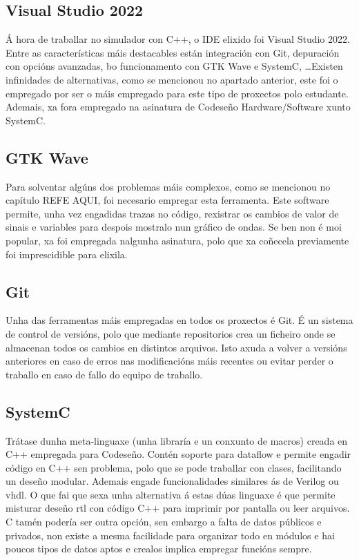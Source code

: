 \subsection{Visual Studio 2022}\label{sec:visual_studio}
Á hora de traballar no simulador con C++, o IDE elixido foi Visual Studio 2022. Entre as características máis destacables están integración con Git, depuración con opcións avanzadas, bo funcionamento con GTK Wave e SystemC, \dots Existen infinidades de alternativas, como se mencionou no apartado anterior, este foi o empregado por ser o máis empregado para este tipo de proxectos polo estudante. Ademais, xa fora empregado na asinatura de Codeseño \gls{Hardware}/\gls{Software} xunto SystemC. 

\subsection{GTK Wave}\label{sec:gtkwave}
Para solventar algúns dos problemas máis complexos, como se mencionou no capítulo REFE AQUI, foi necesario empregar esta ferramenta. Este software permite, unha vez engadidas trazas no código, rexistrar os cambios de valor de sinais e variables para despois mostralo nun gráfico de ondas. Se ben non é moi popular, xa foi empregada nalgunha asinatura, polo que xa coñecela previamente foi imprescidible para elixila.

\subsection{Git}\label{sec:git}
Unha das ferramentas máis empregadas en todos os proxectos é Git. É un sistema de control de versións, polo que mediante repositorios crea un ficheiro onde se almacenan todos os cambios en distintos arquivos. Isto axuda a volver a versións anteriores en caso de erros nas modificacións máis recentes ou evitar perder o traballo en caso de fallo do equipo de traballo.


\subsection{SystemC}\label{sec:systemc}
Trátase dunha meta-linguaxe (unha libraría e un conxunto de macros) creada en C++ empregada para Codeseño. Contén soporte para dataflow e permite engadir código en C++ sen problema, polo que se pode traballar con clases, facilitando un deseño modular. Ademais engade funcionalidades similares ás de Verilog ou \acrshort{vhdl}. O que fai que sexa unha alternativa á estas dúas linguaxe é que permite misturar deseño \acrshort{rtl} con código C++ para imprimir por pantalla ou leer arquivos. C tamén podería ser outra opción, sen embargo a falta de datos públicos e privados, non existe a mesma facilidade para organizar todo en módulos e hai poucos tipos de datos aptos e crealos implica empregar funcións sempre.



